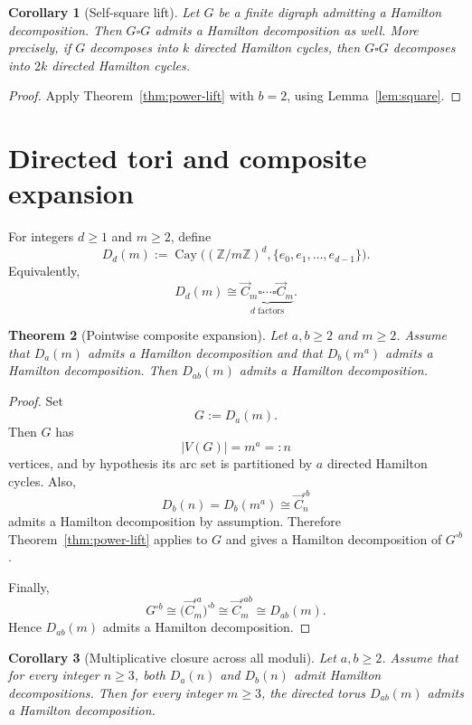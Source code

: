 \documentclass[11pt]{article}
\newtheorem{theorem}{Theorem}
\newtheorem{corollary}[theorem]{Corollary}
\DeclareMathOperator{\Cay}{Cay}
\newcommand{\Cdir}{\vec C}
\newcommand{\torus}[2]{D_{#1}(#2)}
\begin{document}
\begin{corollary}[Self-square lift]\label{cor:self-square}
Let $G$ be a finite digraph admitting a Hamilton decomposition.
Then $G\square G$ admits a Hamilton decomposition as well.
More precisely, if $G$ decomposes into $k$ directed Hamilton cycles, then
$G\square G$ decomposes into $2k$ directed Hamilton cycles.
\end{corollary}

\begin{proof}
Apply Theorem~\ref{thm:power-lift} with $b=2$, using
Lemma~\ref{lem:square}.
\end{proof}

\section{Directed tori and composite expansion}

For integers $d\ge 1$ and $m\ge 2$, define
\[
\torus{d}{m} := \Cay\bigl((\mathbb Z/m\mathbb Z)^d,\{e_0,e_1,\dots,e_{d-1}\}\bigr).
\]
Equivalently,
\[
\torus{d}{m}\cong \underbrace{\Cdir_m\square\cdots\square\Cdir_m}_{d\text{ factors}}.
\]

\begin{theorem}[Pointwise composite expansion]\label{thm:pointwise-composite}
Let $a,b\ge 2$ and $m\ge 2$.
Assume that $\torus{a}{m}$ admits a Hamilton decomposition and that
$\torus{b}{m^a}$ admits a Hamilton decomposition.
Then $\torus{ab}{m}$ admits a Hamilton decomposition.
\end{theorem}

\begin{proof}
Set
\[
G:=\torus{a}{m}.
\]
Then $G$ has
\[
|V(G)|=m^a=:n
\]
vertices, and by hypothesis its arc set is partitioned by $a$ directed
Hamilton cycles.
Also,
\[
\torus{b}{n}=\torus{b}{m^a}\cong \Cdir_n^{\square b}
\]
admits a Hamilton decomposition by assumption.
Therefore Theorem~\ref{thm:power-lift} applies to $G$ and gives a Hamilton
decomposition of $G^{\square b}$.

Finally,
\[
G^{\square b}
\cong
\bigl(\Cdir_m^{\square a}\bigr)^{\square b}
\cong
\Cdir_m^{\square ab}
\cong
\torus{ab}{m}.
\]
Hence $\torus{ab}{m}$ admits a Hamilton decomposition.
\end{proof}

\begin{corollary}[Multiplicative closure across all moduli]
\label{cor:multiplicative-closure}
Let $a,b\ge 2$.
Assume that for every integer $n\ge 3$, both $\torus{a}{n}$ and $\torus{b}{n}$
admit Hamilton decompositions.
Then for every integer $m\ge 3$, the directed torus $\torus{ab}{m}$ admits a
Hamilton decomposition.
\end{corollary}
\end{document}
